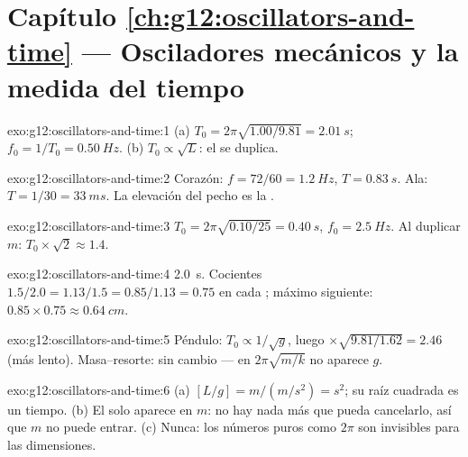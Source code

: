 \section*{Capítulo \ref{ch:g12:oscillators-and-time} --- Osciladores mecánicos y la medida del tiempo}

\begin{solution}{exo:g12:oscillators-and-time:1}
(a) $T_0 = 2\pi\sqrt{1.00/9.81} = \qty{2.01}{s}$;
$f_0 = 1/T_0 = \qty{0.50}{Hz}$. (b) $T_0 \propto \sqrt{L}$: el 
se duplica.
\end{solution}

\begin{solution}{exo:g12:oscillators-and-time:2}
Corazón: $f = 72/60 = \qty{1.2}{Hz}$, $T = \qty{0.83}{s}$. Ala:
$T = 1/30 = \qty{33}{ms}$. La elevación del pecho es la
\emph{}.
\end{solution}

\begin{solution}{exo:g12:oscillators-and-time:3}
$T_0 = 2\pi\sqrt{0.10/25} = \qty{0.40}{s}$, $f_0 = \qty{2.5}{Hz}$. Al
duplicar $m$: $T_0 \times \sqrt{2} \approx 1.4$.
\end{solution}

\begin{solution}{exo:g12:oscillators-and-time:4}
 \qty{2.0}{s}. Cocientes
$1.5/2.0 = 1.13/1.5 = 0.85/1.13 = 0.75$ en cada ; máximo
siguiente: $0.85 \times 0.75 \approx \qty{0.64}{cm}$.
\end{solution}

\begin{solution}{exo:g12:oscillators-and-time:5}
Péndulo: $T_0 \propto 1/\sqrt{g}$, luego $\times\sqrt{9.81/1.62} = 2.46$
(más lento). Masa--resorte: sin cambio --- en $2\pi\sqrt{m/k}$ no
aparece $g$.
\end{solution}

\begin{solution}{exo:g12:oscillators-and-time:6}
(a) $[L/g] = \unit{m}/(\unit{m/s^2}) = \unit{s^2}$; su raíz cuadrada es
un tiempo. (b) El  solo aparece en $m$: no hay nada más que
pueda cancelarlo, así que $m$ no puede entrar. (c) Nunca: los números
puros como $2\pi$ son invisibles para las dimensiones.
\end{solution}

